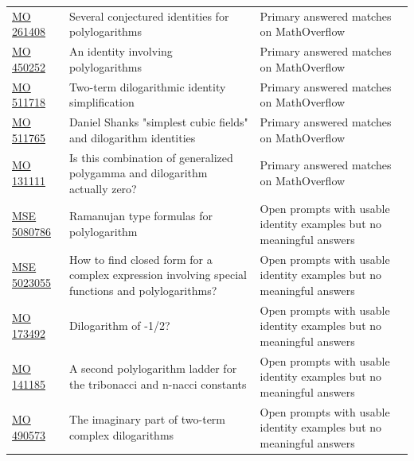 \begin{longtable}{@{}p{}p{}p{}@{}}
\href{https://mathoverflow.net/questions/261408/several-conjectured-identities-for-polylogarithms}{MO 261408} & Several conjectured identities for polylogarithms & Primary answered matches on MathOverflow\\
\href{https://mathoverflow.net/questions/450252/an-identity-involving-polylogarithms}{MO 450252} & An identity involving polylogarithms & Primary answered matches on MathOverflow\\
\href{https://mathoverflow.net/questions/511718/two-term-dilogarithmic-identity-simplification}{MO 511718} & Two-term dilogarithmic identity simplification & Primary answered matches on MathOverflow\\
\href{https://mathoverflow.net/questions/511765/daniel-shanks-simplest-cubic-fields-and-dilogarithm-identities}{MO 511765} & Daniel Shanks "simplest cubic fields" and dilogarithm identities & Primary answered matches on MathOverflow\\
\href{https://mathoverflow.net/questions/131111/is-this-combination-of-generalized-polygamma-and-dilogarithm-actually-zero-im}{MO 131111} & Is this combination of generalized polygamma and dilogarithm actually zero? & Primary answered matches on MathOverflow\\
\href{https://math.stackexchange.com/questions/5080786/ramanujan-type-formulas-for-polylogarithm}{MSE 5080786} & Ramanujan type formulas for polylogarithm & Open prompts with usable identity examples but no meaningful answers\\
\href{https://math.stackexchange.com/questions/5023055/how-to-find-closed-form-for-a-complex-expression-involving-special-functions-and}{MSE 5023055} & How to find closed form for a complex expression involving special functions and polylogarithms? & Open prompts with usable identity examples but no meaningful answers\\
\href{https://mathoverflow.net/questions/173492/dilogarithm-of-1-2}{MO 173492} & Dilogarithm of -1/2? & Open prompts with usable identity examples but no meaningful answers\\
\href{https://mathoverflow.net/questions/141185/a-second-polylogarithm-ladder-for-the-tribonacci-and-n-nacci-constants}{MO 141185} & A second polylogarithm ladder for the tribonacci and n-nacci constants & Open prompts with usable identity examples but no meaningful answers\\
\href{https://mathoverflow.net/questions/490573/the-imaginary-part-of-two-term-complex-dilogarithms}{MO 490573} & The imaginary part of two-term complex dilogarithms & Open prompts with usable identity examples but no meaningful answers\\

\end{longtable}
